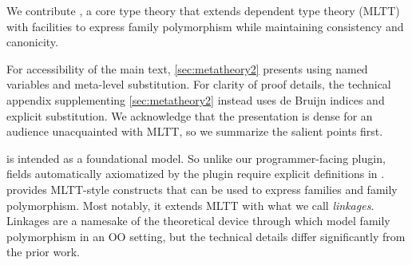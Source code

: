 We contribute \TT, a core type theory that extends
\citeauthor{martin1982constructive} dependent type theory (MLTT)
with facilities to express family polymorphism
while maintaining consistency and canonicity.
%

For accessibility of the main text, \cref{sec:metatheory2} presents \TT using
named variables and meta-level substitution.
For clarity of proof details, the technical appendix supplementing
\cref{sec:metatheory2} instead uses de Bruijn indices and explicit substitution.
%
We acknowledge that the presentation is dense for an audience
unacquainted with MLTT, so we summarize the salient points first.


\TT is intended as a foundational model. So unlike our programmer-facing plugin,
fields automatically axiomatized by the plugin require explicit definitions in \TT.
%
\TT provides MLTT-style constructs that can be used to express families and
family polymorphism. %
%
Most notably, it extends MLTT with what we call \emph{linkages}.
Linkages are a namesake of the theoretical device through which \citet{zm2017} model
family polymorphism in an OO setting, but the technical details differ significantly from the prior work.

